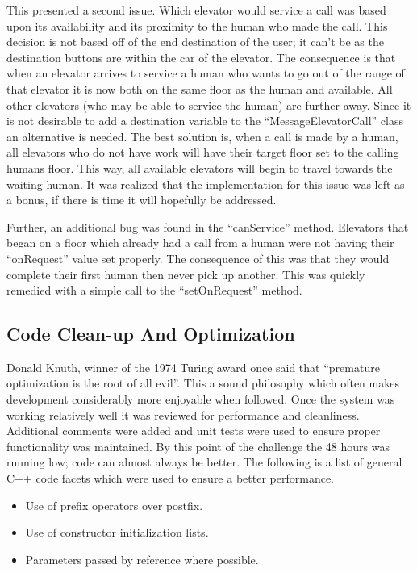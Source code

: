 \documentclass{article}
\begin{document}
This presented a second issue.
Which elevator would service a call was based upon its availability and its proximity to the human who made the call.
This decision is not based off of the end destination of the user; it can't be as the destination buttons are within the car of the elevator.
The consequence is that when an elevator arrives to service a human who wants to go out of the range of that elevator it is now both on the same floor as the human and available.
All other elevators (who may be able to service the human) are further away.
Since it is not desirable to add a destination variable to the ``MessageElevatorCall'' class an alternative is needed.
The best solution is, when a call is made by a human, all elevators who do not have work will have their target floor set to the calling humans floor.
This way, all available elevators will begin to travel towards the waiting human.
It was realized that the implementation for this issue was left as a bonus, if there is time it will hopefully be addressed.

Further, an additional bug was found in the ``canService'' method.
Elevators that began on a floor which already had a call from a human were not having their ``onRequest'' value set properly.
The consequence of this was that they would complete their first human then never pick up another.
This was quickly remedied with a simple call to the ``setOnRequest'' method.

\subsection{Code Clean-up And Optimization}
Donald Knuth, winner of the 1974 Turing award once said that ``premature optimization is the root of all evil''.
This a sound philosophy which often makes development considerably more enjoyable when followed.
Once the system was working relatively well it was reviewed for performance and cleanliness.
Additional comments were added and unit tests were used to ensure proper functionality was maintained.
By this point of the challenge the 48 hours was running low; code can almost always be better.
The following is a list of general C++ code facets which were used to ensure a better performance.
\begin{itemize}
	\item Use of prefix operators over postfix.
	\item Use of constructor initialization lists.
	\item Parameters passed by reference where possible.
\end{itemize} 
\end{document}
